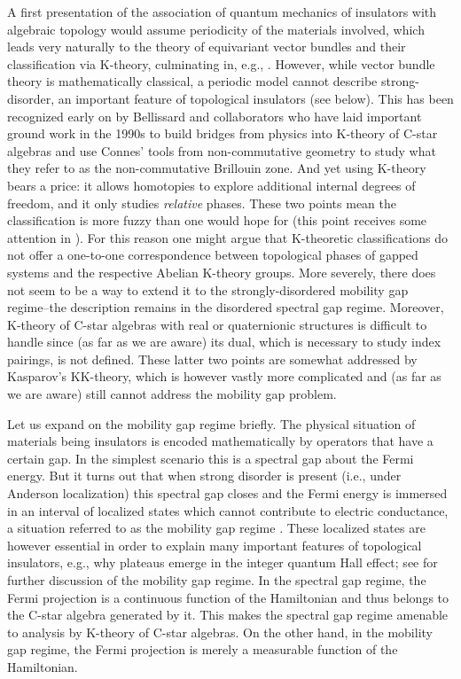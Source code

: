 \documentclass[a4paper,10pt]{article}
\numberwithin{equation}{section}
\theoremstyle{plain}
\theoremstyle{plain}
\theoremstyle{plain}
\theoremstyle{plain}
\theoremstyle{plain}
\theoremstyle{remark}
\theoremstyle{definition}
\theoremstyle{plain}
\begin{document}
	
	A first presentation of the association of quantum mechanics of insulators with algebraic topology would assume periodicity of the materials involved, which leads very naturally to the theory of equivariant vector bundles and their classification via K-theory, culminating in, e.g., \cite{FreedMoore2013}. However, while vector bundle theory is mathematically classical, a periodic model cannot describe strong-disorder, an important feature of topological insulators (see below). 
	This has been recognized early on by Bellissard and collaborators \cite{Bellissard_1994JMP....35.5373B} who have laid important ground work in the 1990s to build bridges from physics into K-theory of C-star algebras and use Connes' tools from non-commutative geometry to study what they refer to as the non-commutative Brillouin zone. And yet using K-theory bears a price: it allows homotopies to explore additional internal degrees of freedom, and it only studies \emph{relative} phases. These two points mean the classification is more fuzzy than one would hope for (this point receives some attention in \cite{DeNittisGomi2015}). For this reason one might argue that K-theoretic classifications do not offer a one-to-one correspondence between topological phases of gapped systems and the respective Abelian K-theory groups. More severely, there does not seem to be a way to extend it to the strongly-disordered mobility gap regime--the description remains in the disordered spectral gap regime. Moreover, K-theory of C-star algebras with real or quaternionic structures is difficult to handle since (as far as we are aware) its dual, which is necessary to study index pairings, is not defined. These latter two points are somewhat addressed by Kasparov's KK-theory, which is however vastly more complicated and (as far as we are aware) still cannot address the mobility gap problem.
	
	Let us expand on the mobility gap regime briefly. The physical situation of materials being insulators is encoded mathematically by operators that have a certain gap. In the simplest scenario this is a spectral gap about the Fermi energy. But it turns out that when strong disorder is present (i.e., under Anderson localization) this spectral gap closes and the Fermi energy is immersed in an interval of localized states which cannot contribute to electric conductance, a situation referred to as the mobility gap regime \cite{Aizenman_Graf_1998}. These localized states are however essential in order to explain many important features of topological insulators, e.g., why plateaus emerge in the integer quantum Hall effect; see \cite{EGS_2005,Graf_Shapiro_2018_1D_Chiral_BEC,Shapiro2019,Shapiro20,BSS23} for further discussion of the mobility gap regime. In the spectral gap regime, the Fermi projection is a continuous function of the Hamiltonian and thus belongs to the C-star algebra generated by it. This makes the spectral gap regime amenable to analysis by K-theory of C-star algebras. On the other hand, in the mobility gap regime, the Fermi projection is merely a measurable function of the Hamiltonian.
	
\end{document}
